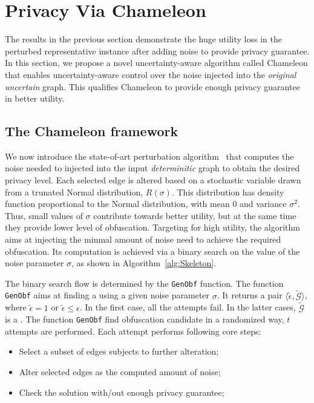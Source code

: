 \section{Privacy Via Chameleon}
The results in the previous section demonstrate the huge utility loss in the perturbed representative instance after adding noise to provide privacy guarantee. In this section, we propose a novel uncertainty-aware algorithm called Chameleon that enables uncertainty-aware control over the noise injected into the \emph{original uncertain} graph. This qualifies Chameleon to provide enough privacy guarantee in better utility. 

\subsection{The Chameleon framework}

We now introduce the state-of-art perturbation algorithm~\cite{Boldi_Injecting_2012} that computes the noise needed to injected into the input \emph{determinitic} graph to obtain the desired privacy level. Each selected edge is altered based on a stochastic variable drawn from a trunated Normal distribution, $R(\sigma)$. This distribution has density function proportional to the Normal distribution, with mean $0$ and variance $\sigma^2$. Thus, small values of $\sigma$ contribute towards better utility, but at the same time they provide lower level of obfuscation. Targeting for high utility, the algorithm aims at injecting the minmal amount of noise need to achieve the required obfuscation. Its computation is achieved via a binary search on the value of the noise parameter $\sigma$, as shown in Algorithm~\ref{alg:Skeleton}. 

The binary search flow is determined by the \texttt{GenObf} function. 
The function \texttt{GenObf} aims at finding a {\keobf} using a given noise parameter $\sigma$.
It returns a pair $\langle \tilde{\epsilon}, \tilde{\mathcal{G}} \rangle$, where $\tilde{\epsilon} =1$ or $\tilde{\epsilon} \le \epsilon$. In the first case, all the attempts fail. In the latter cases, $\tilde{\mathcal{G}}$ is a {\keobf}. 
The function \texttt{GenObf} find obfuscation candidate in a randomized way, $t$ attempts are performed. Each attempt performs following core steps:
\begin{itemize}
    \item{Select a subset of edges subjects to further alteration;}
    \item{Alter selected edges as the computed amount of noise;}
    \item{Check the solution with/out enough privacy guarantee;}
\end{itemize}

